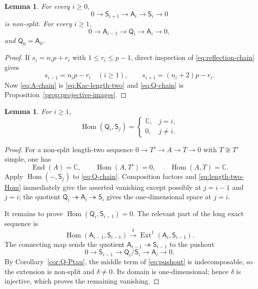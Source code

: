 \documentclass[12pt,leqno]{amsart}
\numberwithin{equation}{section}
\newtheorem{lem}[thm]{Lemma}
\newcommand{\End}{\operatorname{End}}
\newcommand{\Hom}{\operatorname{Hom}}
\newcommand{\Ext}{\operatorname{Ext}}
\def\C{\mathbb{C}}
\begin{document}
\begin{lem}\label{lem:chain-filtrations}
For every $i\geq0$,
\begin{equation}\label{eq:A-chain}
 0\longrightarrow\mathsf S_{i+1}\longrightarrow\mathsf A_i
 \longrightarrow\mathsf S_i\longrightarrow0
\end{equation}
is non-split.  For every $i\geq1$,
\begin{equation}\label{eq:Q-chain}
 0\longrightarrow\mathsf A_{i-1}\longrightarrow\mathsf Q_i
 \longrightarrow\mathsf A_i\longrightarrow0,
\end{equation}
and $\mathsf Q_0=\mathsf A_0$.
\end{lem}

\begin{proof}
If $s_i=n_ip+r_i$ with $1\leq r_i\leq p-1$, direct inspection of
\eqref{eq:reflection-chain} gives
\[
 s_{i-1}=n_ip-r_i\quad(i\geq1),
 \qquad s_{i+1}=(n_i+2)p-r_i.
\]
Now \eqref{eq:A-chain} is \eqref{eq:Kac-length-two} and
\eqref{eq:Q-chain} is Proposition~\ref{prop:projective-images}.
\end{proof}

\begin{lem}\label{lem:Q-simple-Hom}
For $i\geq1$,
\begin{equation}\label{eq:Q-simple-Hom}
 \Hom(\mathsf Q_i,\mathsf S_j)=
 \begin{cases}
 \C,&j=i,\\
 0,&j\neq i.
 \end{cases}
\end{equation}
\end{lem}

\begin{proof}
For a non-split length-two sequence
$0\to T'\to A\to T\to0$ with $T\not\cong T'$ simple, one has
\begin{equation}\label{eq:length-two-Hom}
 \End(A)=\C,
 \qquad \Hom(A,T')=0,
 \qquad \Hom(A,T)=\C.
\end{equation}
Apply $\Hom(-,\mathsf S_j)$ to \eqref{eq:Q-chain}.  Composition factors and
\eqref{eq:length-two-Hom} immediately give the asserted vanishing except
possibly at $j=i-1$ and $j=i$; the quotient
$\mathsf Q_i\twoheadrightarrow\mathsf A_i\twoheadrightarrow\mathsf S_i$
gives the one-dimensional space at $j=i$.

It remains to prove $\Hom(\mathsf Q_i,\mathsf S_{i-1})=0$.  The relevant
part of the long exact sequence is
\[
 \Hom(\mathsf A_{i-1},\mathsf S_{i-1})
 \xrightarrow{\delta}
 \Ext^1(\mathsf A_i,\mathsf S_{i-1}).
\]
The connecting map sends the quotient
$\mathsf A_{i-1}\twoheadrightarrow\mathsf S_{i-1}$ to the pushout
\begin{equation}\label{eq:pushout}
 0\longrightarrow\mathsf S_{i-1}\longrightarrow
 \mathsf Q_i/\mathsf S_i\longrightarrow\mathsf A_i
 \longrightarrow0.
\end{equation}
By Corollary~\ref{cor:Q-Ptau}, the middle term of
\eqref{eq:pushout} is indecomposable, so the extension is non-split and
$\delta\neq0$.  Its domain is one-dimensional; hence $\delta$ is injective,
which proves the remaining vanishing.
\end{proof}
\end{document}
